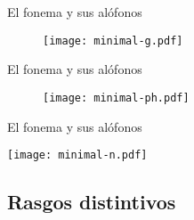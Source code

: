 \documentclass[12pt]{article}
\begin{document}
	\begin{center}
		\end{center}




	El fonema  y sus alófonos\\
\begin{figure}
\texttt{[image: minimal-g.pdf]}
\end{figure}



	\begin{center}
		\end{center}



	El fonema  y sus alófonos\\
\begin{figure}
  \texttt{[image: minimal-ph.pdf]}
  \end{figure}




	\begin{center}
		\end{center}



	El fonema  y sus alófonos\\
\newbox{\Myn}
\begin{lrbox}{\Myn}
\texttt{[image: minimal-n.pdf]}
\end{lrbox}
\scalebox{.9}{\usebox{\Myn}}



%
%








\subsection{Rasgos distintivos}
\end{document}
